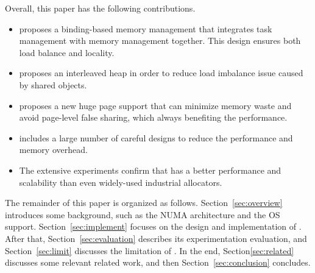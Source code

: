 Overall, this paper has the following contributions. 

\begin{itemize}
\item \NM{} proposes a binding-based memory management that integrates task management with memory management together. This design ensures both load balance and locality.  
\item \NM{} proposes an interleaved heap in order to reduce load imbalance issue caused by shared objects. 
\item \NM{} proposes a new huge page support that can minimize memory waste and avoid page-level false sharing, which always benefiting the performance. 
\item \NM{} includes a large number of careful designs to reduce the performance and memory overhead. 
\item The extensive experiments confirm that \NM{} has a better performance and scalability than even widely-used industrial allocators. 
\end{itemize}

The remainder of this paper is organized as follows. Section~\ref{sec:overview} introduces some background, such as the NUMA architecture and the OS support. Section~\ref{sec:implement} focuses on the design and implementation of \NM{}. After that, Section~\ref{sec:evaluation} describes its experimentation evaluation, and Section~\ref{sec:limit} discusses the limitation of \NM{}. In the end, Section\ref{sec:related} discusses some relevant related work, and then Section~\ref{sec:conclusion} concludes. 

